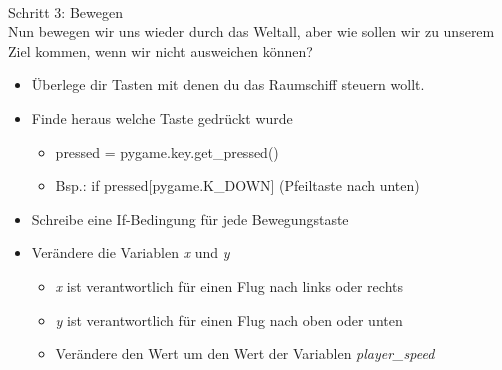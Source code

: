 \\
\large Schritt 3: Bewegen\\
Nun bewegen wir uns wieder durch das Weltall, aber wie sollen wir zu unserem Ziel kommen, wenn wir nicht ausweichen können?
\begin{itemize}
	\item Überlege dir Tasten mit denen du das Raumschiff steuern wollt.
	\item Finde heraus welche Taste gedrückt wurde
	\begin{itemize}
		\item pressed = pygame.key.get\_pressed()
		\item Bsp.: if pressed[pygame.K_DOWN] (Pfeiltaste nach unten)
	\end{itemize}
	\item Schreibe eine If-Bedingung für jede Bewegungstaste
	\item Verändere die Variablen \textit{x} und \textit{y}
	\begin{itemize}
		\item \textit{x} ist verantwortlich für einen Flug nach links oder rechts
		\item \textit{y} ist verantwortlich für einen Flug nach oben oder unten
		\item Verändere den Wert um den Wert der Variablen \textit{player\_speed}
	\end{itemize}	 
\end{itemize}